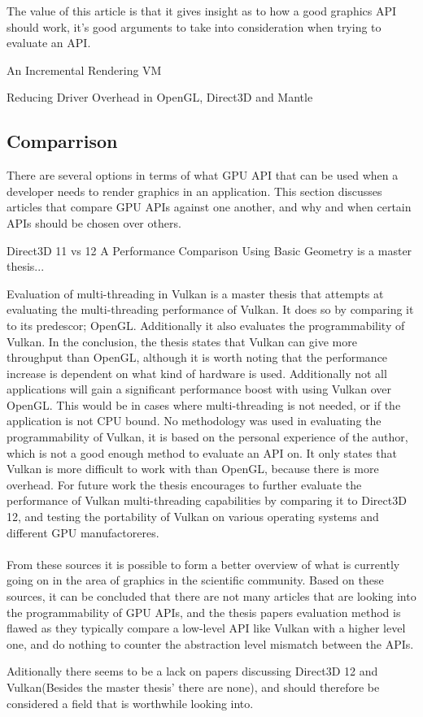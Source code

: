 The value of this article is that it gives insight as to how a good graphics \gls{API} should work, it's good arguments to take into consideration when trying to evaluate an \gls{API}.

An Incremental Rendering VM \cite{haaser_2015_incremental} 

Reducing Driver Overhead in OpenGL, Direct3D and Mantle  \cite{dobersberger_2015_reducing}

\subsection{Comparrison}
There are several options in terms of what \gls{GPU} \gls{API} that can be used when a developer needs to render graphics in an application. This section discusses articles that compare \gls{GPU} \glspl{API} against one another, and why and when certain \glspl{API} should be chosen over others.

Direct3D 11 vs 12 A Performance Comparison Using Basic Geometry \cite{2016_direct3d} is a master thesis...


Evaluation of multi-threading in Vulkan \cite{blackert_2016_evaluation} is a master thesis that attempts at evaluating the multi-threading performance of Vulkan. It does so by comparing it to its predescor; OpenGL. 
Additionally it also evaluates the programmability of Vulkan. 
In the conclusion, the thesis states that Vulkan can give more throughput than OpenGL, although it is worth noting that the performance increase is dependent on what kind of hardware is used. Additionally not all applications will gain a significant performance boost with using Vulkan over OpenGL. 
This would be in cases where multi-threading is not needed, or if the application is not CPU bound. No methodology was used in evaluating the programmability of Vulkan, it is based on the personal experience of the author, which is not a good enough method to evaluate an \gls{API} on. 
It only states that Vulkan is more difficult to work with than OpenGL, because there is more overhead. 
For future work the thesis encourages to further evaluate the performance of Vulkan multi-threading  capabilities by comparing it to Direct3D 12, and testing the portability of Vulkan on various operating systems and different \gls{GPU} manufactoreres.

\paragraph{}
From these sources it is possible to form a better overview of what is currently going on in the area of graphics in the scientific community. Based on these sources, it can be concluded that there are not many articles that are looking into the programmability of \gls{GPU} \glspl{API}, and the thesis papers evaluation method is flawed as they typically compare a low-level \gls{API} like Vulkan with a higher level one, and do nothing to counter the abstraction level mismatch between the \glspl{API}.

Aditionally there seems to be a lack on papers discussing Direct3D 12 and Vulkan(Besides the master thesis' there are none), and should therefore be considered a field that is worthwhile looking into.
